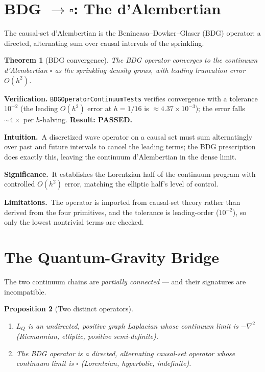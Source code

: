 \documentclass[10pt,twoside,openany]{book}
\newtheorem{theorem}{Theorem}[chapter]
\newtheorem{proposition}[theorem]{Proposition}
\newcommand{\theoremnotes}[3]{%
  \par\medskip\noindent
  \textbf{Intuition.}\ #1\par
  \textbf{Significance.}\ #2\par
  \textbf{Limitations.}\ #3\par}
\begin{document}
\section{BDG $\to \square$: The d'Alembertian}
\label{ch:dalembertian}

The causal-set d'Alembertian is the Benincasa--Dowker--Glaser (BDG) operator: a
directed, alternating sum over causal intervals of the sprinkling.

\begin{theorem}[BDG convergence]
The BDG operator converges to the continuum d'Alembertian $\square$ as the sprinkling
density grows, with leading truncation error $O(h^2)$.
\end{theorem}

\textbf{Verification.} \texttt{BDGOperatorContinuumTests} verifies convergence with a
tolerance $10^{-2}$ (the leading $O(h^2)$ error at $h=1/16$ is $\approx4.37\times10^{-3}$);
the error falls $\sim4\times$ per $h$-halving. \textbf{Result: PASSED.}

\theoremnotes
{A discretized wave operator on a causal set must sum alternatingly over past and future
intervals to cancel the leading terms; the BDG prescription does exactly this, leaving the
continuum d'Alembertian in the dense limit.}
{It establishes the Lorentzian half of the continuum program with controlled $O(h^2)$
error, matching the elliptic half's level of control.}
{The operator is imported from causal-set theory rather than derived from the four
primitives, and the tolerance is leading-order ($10^{-2}$), so only the lowest nontrivial
terms are checked.}

\section{The Quantum-Gravity Bridge}
\label{ch:bridge}

The two continuum chains are \emph{partially connected} — and their signatures are
incompatible.

\begin{proposition}[Two distinct operators]
\begin{enumerate}
\item $L_Q$ is an \emph{undirected, positive} graph Laplacian whose continuum limit is
$-\nabla^2$ (Riemannian, elliptic, positive semi-definite).
\item The BDG operator is a \emph{directed, alternating} causal-set operator whose
continuum limit is $\square$ (Lorentzian, hyperbolic, indefinite).
\end{enumerate}
\end{proposition}
\end{document}
